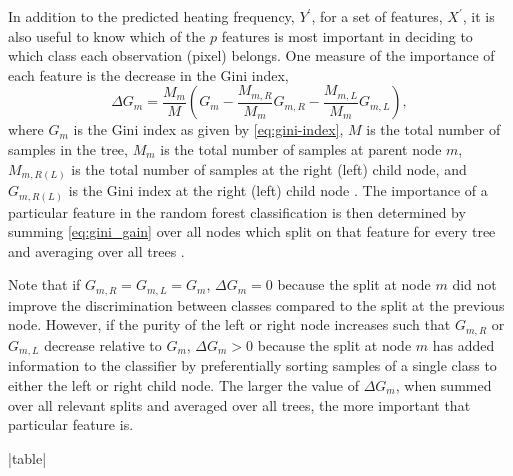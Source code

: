In addition to the predicted heating frequency, $Y^\prime$, for a set of features, $X^\prime$, it is also useful to know which of the $p$ features is most important in deciding to which class each observation (pixel) belongs.
One measure of the importance of each feature is the decrease in the Gini index,
\begin{equation}\label{eq:gini_gain}
    \Delta G_m = \frac{M_m}{M}\left( G_m - \frac{M_{m,R}}{M_m}G_{m,R} - \frac{M_{m,L}}{M_m}G_{m,L} \right),
\end{equation}
where $G_m$ is the Gini index as given by \autoref{eq:gini-index}, $M$ is the total number of samples in the tree, $M_m$ is the total number of samples at parent node $m$, $M_{m,R(L)}$ is the total number of samples at the right (left) child node, and $G_{m,R(L)}$ is the Gini index at the right (left) child node \citep{sandri_bias_2008}.
The importance of a particular feature in the random forest classification is then determined by summing \autoref{eq:gini_gain} over all nodes which split on that feature for every tree and averaging over all trees \citep{breiman_classification_1984}.

Note that if $G_{m,R}=G_{m,L}=G_m$, $\Delta G_m=0$ because the split at node $m$ did not improve the discrimination between classes compared to the split at the previous node.
However, if the purity of the left or right node increases such that $G_{m,R}$ or $G_{m,L}$ decrease relative to $G_m$, $\Delta G_m > 0$ because the split at node $m$ has added information to the classifier by preferentially sorting samples of a single class to either the left or right child node.
The larger the value of $\Delta G_m$, when summed over all relevant splits and averaged over all trees, the more important that particular feature is.

\py[manager_ml]|table|

